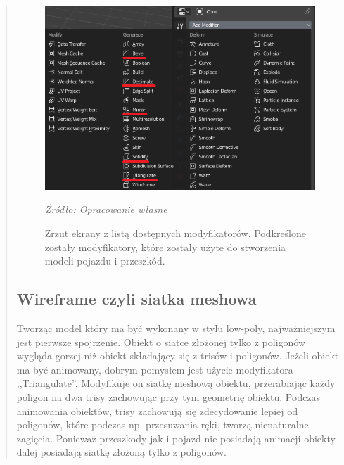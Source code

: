 \begin{quotation}
\begin{figure}[!hbt]
\centering
  \includegraphics[width=1\linewidth]{modyfikatory.png}
  \caption{Zrzut ekrany z listą dostępnych modyfikatorów. Podkreślone zostały modyfikatory, które zostały użyte do stworzenia modeli pojazdu i przeszkód.}\label{rys_8}
  \begin{minipage}[t]{0.75\linewidth}
    \emph{Źródło: Opracowanie własne}
  \end{minipage}
\end{figure}

\subsection{Wireframe czyli siatka meshowa}
\indent Tworząc model który ma być wykonany w stylu low-poly, najważniejszym jest pierwsze spojrzenie. Obiekt o siatce złożonej tylko z poligonów wygląda gorzej niż obiekt składający się z trisów i poligonów. Jeżeli obiekt ma być animowany, dobrym pomysłem jest użycie modyfikatora ,,Triangulate''. Modyfikuje on siatkę meshową obiektu, przerabiając każdy poligon na dwa trisy zachowując przy tym geometrię obiektu. Podczas animowania obiektów, trisy zachowują się zdecydowanie lepiej od poligonów, które podczas np. przesuwania ręki, tworzą nienaturalne zagięcia. Ponieważ przeszkody jak i pojazd nie posiadają animacji obiekty dalej posiadają siatkę złożoną tylko z poligonów.


\end{quotation}
